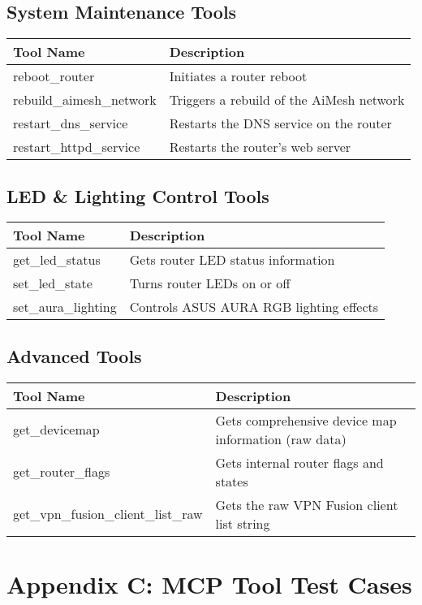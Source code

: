 \section*{System Maintenance Tools}
\begin{tabular}{|p{6cm}|p{9cm}|}
\hline
\textbf{Tool Name} & \textbf{Description} \\
\hline
reboot\_router & Initiates a router reboot \\
\hline
rebuild\_aimesh\_network & Triggers a rebuild of the AiMesh network \\
\hline
restart\_dns\_service & Restarts the DNS service on the router \\
\hline
restart\_httpd\_service & Restarts the router's web server \\
\hline
\end{tabular}

\section*{LED \& Lighting Control Tools}
\begin{tabular}{|p{6cm}|p{9cm}|}
\hline
\textbf{Tool Name} & \textbf{Description} \\
\hline
get\_led\_status & Gets router LED status information \\
\hline
set\_led\_state & Turns router LEDs on or off \\
\hline
set\_aura\_lighting & Controls ASUS AURA RGB lighting effects \\
\hline
\end{tabular}

\section*{Advanced Tools}
\begin{tabular}{|p{6cm}|p{9cm}|}
\hline
\textbf{Tool Name} & \textbf{Description} \\
\hline
get\_devicemap & Gets comprehensive device map information (raw data) \\
\hline
get\_router\_flags & Gets internal router flags and states \\
\hline
get\_vpn\_fusion\_client\_list\_raw & Gets the raw VPN Fusion client list string \\
\hline
\end{tabular}

\chapter*{Appendix C: MCP Tool Test Cases}
\label{app:mcp_test_cases}

